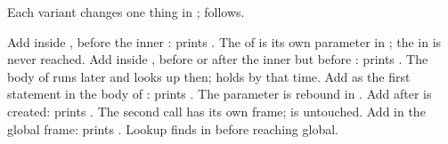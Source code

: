 \documentclass[10pt]{scrartcl}
\begin{document}
\begin{example*}
Each variant changes one thing in ;  follows.
\begin{itemize}
  \ii Add  inside , before the inner : prints . The  of  is its own parameter in ; the  in  is never reached.
  \ii Add  inside , before or after the inner  but before : prints . The body of  runs later and looks  up then;  holds  by that time.
  \ii Add  as the first statement in the body of : prints . The parameter is rebound in .
  \ii Add  after  is created: prints . The second call has its own frame;  is untouched.
  \ii Add  in the global frame: prints . Lookup finds  in  before reaching global.
\end{itemize}
\end{example*}
\end{document}

